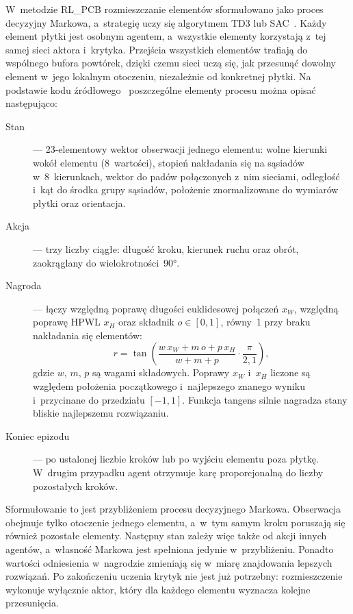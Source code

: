 W~metodzie RL\_PCB rozmieszczanie elementów sformułowano jako proces
decyzyjny Markowa, a~strategię uczy się algorytmem TD3 lub
SAC~\cite{Vassallo2024RLPCB,Vassallo_RLPCB_GitHub}. Każdy element płytki
jest osobnym agentem, a~wszystkie elementy korzystają z~tej samej sieci
aktora i~krytyka. Przejścia wszystkich elementów trafiają do wspólnego
bufora powtórek, dzięki czemu sieci uczą się, jak przesunąć dowolny element
w~jego lokalnym otoczeniu, niezależnie od konkretnej płytki. Na podstawie
kodu źródłowego~\cite{Vassallo_RLPCB_GitHub} poszczególne elementy procesu
można opisać następująco:
\begin{description}
  \item[Stan] --- 23-elementowy wektor obserwacji jednego elementu:
    wolne kierunki wokół elementu (8~wartości), stopień nakładania się na
    sąsiadów w~8~kierunkach, wektor do padów połączonych z~nim sieciami,
    odległość i~kąt do środka grupy sąsiadów, położenie znormalizowane do
    wymiarów płytki oraz orientacja.
  \item[Akcja] --- trzy liczby ciągłe: długość kroku, kierunek ruchu oraz
    obrót, zaokrąglany do wielokrotności~90°.
  \item[Nagroda] --- łączy względną poprawę długości euklidesowej połączeń
    $x_W$, względną poprawę HPWL $x_H$ oraz składnik $o \in [0, 1]$,
    równy~1 przy braku nakładania się elementów:
    \begin{equation}
      r = \tan\left( \frac{w\,x_W + m\,o + p\,x_H}{w + m + p}
          \cdot \frac{\pi}{2{,}1} \right),
      \label{rl:rlpcb-reward}
    \end{equation}
    gdzie $w$, $m$, $p$ są wagami składowych. Poprawy $x_W$ i~$x_H$ liczone
    są względem położenia początkowego i~najlepszego znanego wyniku
    i~przycinane do przedziału $[-1, 1]$. Funkcja tangens silnie nagradza
    stany bliskie najlepszemu rozwiązaniu.
  \item[Koniec epizodu] --- po ustalonej liczbie kroków lub po wyjściu
    elementu poza płytkę. W~drugim przypadku agent otrzymuje karę
    proporcjonalną do liczby pozostałych kroków.
\end{description}

Sformułowanie to jest przybliżeniem procesu decyzyjnego Markowa.
Obserwacja obejmuje tylko otoczenie jednego elementu, a~w~tym samym kroku
poruszają się również pozostałe elementy. Następny stan zależy więc także
od akcji innych agentów, a~własność Markowa jest spełniona jedynie
w~przybliżeniu. Ponadto wartości odniesienia w~nagrodzie zmieniają się
w~miarę znajdowania lepszych rozwiązań. Po zakończeniu uczenia krytyk nie
jest już potrzebny: rozmieszczenie wykonuje wyłącznie aktor, który dla
każdego elementu wyznacza kolejne przesunięcia.
